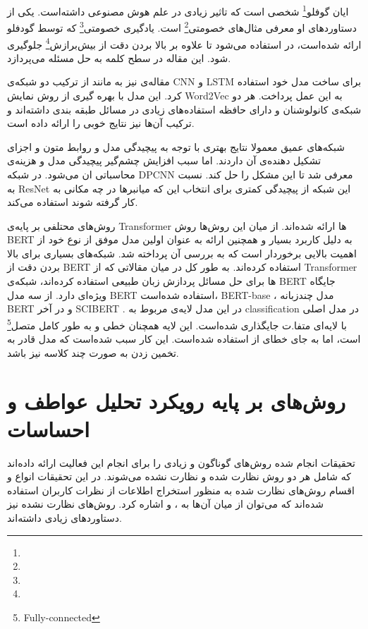 \documentclass[12pt, a4paper, oneside]{report}
\begin{document}
ایان گوفلو\footnote{}
شخصی است که تاثیر زیادی در علم هوش مصنوعی داشته‌است. یکی از دستاورد‌های او معرفی
مثال‌های خصومتی\footnote{}
است.
یادگیری خصومتی\footnote{}
که توسط گودفلو ارائه شده‌است، در
\cite{miyato2017adversarial}
استفاده می‌شود تا علاوه بر بالا بردن دقت از
بیش‌برازش\footnote{}
جلوگیری شود. این مقاله در سطح کلمه به حل مسئله می‌پردازد.

مقاله‌ی
\cite{guggilla-etal-2016-cnn}
نیز به مانند 
\cite{wang-etal-2016-combination}
از ترکیب دو شبکه‌ی
CNN
و
LSTM
برای ساخت مدل خود استفاده کرد. این مدل با بهره گیری از روش نمایش
Word2Vec
به این عمل پرداخت. هر دو شبکه‌ی کانولوشنان و دارای حافظه استفاده‌های زیادی در مسائل طبقه بندی داشته‌اند و ترکیب آن‌ها
نیز نتایج خوبی را ارائه داده است.

شبکه‌های عمیق معمولا نتایج بهتری با توجه به پیچیدگی مدل و روابط متون و اجزای تشکیل دهنده‌ی آن داردند.
اما سبب افزایش چشم‌گیر پیچیدگی مدل و هزینه‌ی محاسباتی ان می‌شود.
در
\cite{johnson-zhang-2017-deep}
شبکه
DPCNN
معرفی شد تا این مشکل را حل کند. نسبت به
ResNet
این شبکه از پیچیدگی کمتری برای انتخاب این که میانبرها در چه مکانی به کار گرفته شوند استفاده می‌کند.

روش‌های محتلفی بر پایه‌ی
Transformer
ها ارائه شده‌اند. از میان این روش‌ها روش
BERT
به دلیل کاربرد بسیار و همچنین ارائه به عنوان اولین مدل موفق از نوع خود از اهمیت بالایی برخوردار است که به بررسی آن
پرداخته شد. شبکه‌های بسیاری برای بالا بردن دقت از
BERT
استفاده کرده‌اند. به طور کل در میان مقالاتی که از
Transformer
ها برای حل مسائل پردازش زبان طبیعی استفاده کرده‌اند، شبکه‌ی
BERT
جایگاه ویژه‌ای دارد.
\cite{schmidt2020data}
از سه مدل
BERT
استفاده شده‌است،
BERT-base
، مدل چندزبانه
BERT
و در آخر
SCIBERT
.
در این مدل لایه‌ی مربوط به
classification
در مدل اصلی با لایه‌ای متفا.ت جایگذاری شده‌است. این لایه همچنان خطی و
به طور کامل متصل\footnote{Fully-connected}
است، اما به جای خطای
از
استفاده شده‌است. این کار سبب شده‌است که مدل قادر به تخمین زدن به صورت چند کلاسه نیز باشد.

\section{روش‌های بر پایه رویکرد تحلیل عواطف و احساسات}

تحقیقات انجام شده روش‌های گوناگون و زیادی را برای انجام این فعالیت ارائه داده‌اند که شامل هر دو روش
نظارت شده و نظارت نشده می‌شوند.
در این تحقیقات انواع و اقسام روش‌های نظارت شده به منظور استخراج اطلاعات از نظرات کاربران
استفاده شده‌اند که می‌توان از میان آن‌ها به
،
و
اشاره کرد.
روش‌های نظارت نشده نیز دستاورد‌های زیادی داشته‌اند.
\end{document}

